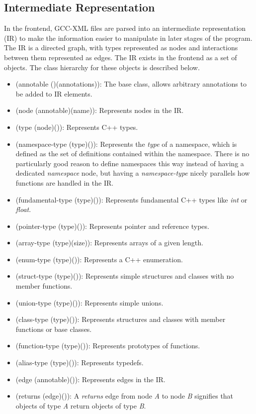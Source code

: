 \documentclass[12pt]{article}
\begin{document}
\subsection{Intermediate Representation}
In the frontend, GCC-XML files are parsed into an intermediate representation (IR) to make the information easier to manipulate in later stages of the program. The IR is a directed graph, with types represented as nodes and interactions between them represented as edges. The IR exists in the frontend as a set of objects. The class hierarchy for these objects is described below. 

\begin{itemize}
\item (annotable ()(annotations)): The base class, allows arbitrary annotations to be added to IR elements.
\item (node (annotable)(name)): Represents nodes in the IR.
\item (type (node)()): Represents C++ types.
\item (namespace-type (type)()): Represents the \emph{type} of a namespace, which is defined as the set of definitions contained within the namespace. There is no particularly good reason to define namespaces this way instead of having a dedicated \emph{namespace} node, but having a \emph{namespace-type} nicely parallels how functions are handled in the IR.
\item (fundamental-type (type)()): Represents fundamental C++ types like \emph{int} or \emph{float}.
\item (pointer-type (type)()): Represents pointer and reference types.
\item (array-type (type)(size)): Represents arrays of a given length.
\item (enum-type (type)()): Represents a C++ enumeration.
\item (struct-type (type)()): Represents simple structures and classes with no member functions.
\item (union-type (type)()): Represents simple unions.
\item (class-type (type)()): Represents structures and classes with member functions or base classes.
\item (function-type (type)()): Represents prototypes of functions.
\item (alias-type (type)()): Represents typedefs.
\item (edge (annotable)()): Represents edges in the IR.
\item (returns (edge)()): A \emph{returns} edge from node \emph{A} to node \emph{B} signifies that objects of type \emph{A} return objects of type \emph{B}.

\end{itemize}
\end{document}
